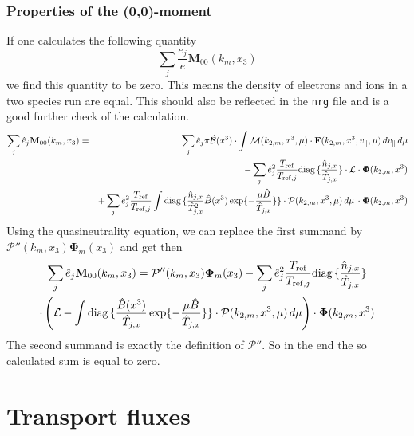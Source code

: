 \subsubsection{Properties of the (0,0)-moment}
If one calculates the following quantity
\begin{displaymath}
  \sum_j\frac{e_j}{e} \mathbf{M}_{00}(k_m,x_3)
\end{displaymath}
we find this quantity to be zero. This means the density of
electrons and ions in a two species run are equal. This should also be
reflected in the \texttt{nrg} file and is a good further check of the
calculation.
\begin{eqnarray*}
   \sum_j\hat{e}_j \mathbf{M}_{00}(k_m,x_3)
   &=& \sum_j\hat{e}_j
   \pi\hat{\mathcal{B}}(x^3)\cdot \int\mathcal{M}(k_{2,m},x^3,\mu)\cdot\mathbf{F}(k_{2,m},x^3,v_\|,\mu)\,dv_\|\,d\mu\\
   && -\sum_j\hat{e}_j^2\frac{T_{\mathrm{ref}}}{T_{\mathrm{ref},j}}\mbox{diag}\,\{\frac{\hat{n}_{j,x}}{\hat{T}_{j,x}}\}\cdot\mathcal{L}\cdot\mathbf{\Phi}(k_{2,m},x^3)\\
   &&+\sum_j\hat{e}_j^2\frac{T_{\mathrm{ref}}}{T_{\mathrm{ref},j}}\int
   \mbox{diag}\,\{\frac{\hat{n}_{j,x}}{\hat{T}_{j,x}^2}\hat{B}(x^3)\exp\{-\frac{\mu \hat{B}}{\hat{T}_{j,x}}\}\}
   \cdot\mathcal{P}(k_{2,m},x^3,\mu)\,d\mu\,\cdot\mathbf{\Phi}(k_{2,m},x^3)
\end{eqnarray*}
Using the quasineutrality equation, we can replace the first summand
by $\mathcal{P}''(k_m,x_3)\mathbf{\Phi}_m(x_3)$ and get then
\begin{multline*}
  \sum_j\hat{e}_j \mathbf{M}_{00}(k_m,x_3)
  = \mathcal{P}''(k_m,x_3)\mathbf{\Phi}_m(x_3)
  -\sum_j\hat{e}_j^2\frac{T_{\mathrm{ref}}}{T_{\mathrm{ref},j}}\mbox{diag}\,\{\frac{\hat{n}_{j,x}}{\hat{T}_{j,x}}\}\\\cdot\left(\mathcal{L}
    -\int\mbox{diag}\,\{\frac{\hat{B}(x^3)}{\hat{T}_{j,x}}\exp\{-\frac{\mu \hat{B}}{\hat{T}_{j,x}}\}\}
    \cdot\mathcal{P}(k_{2,m},x^3,\mu)\,d\mu
  \right)\cdot\mathbf{\Phi}(k_{2,m},x^3)
\end{multline*}
The second summand is exactly the definition of $\mathcal{P}''$. So in
the end the so calculated sum is equal to zero.



\section{Transport fluxes}
\label{sec:transflux_global}

